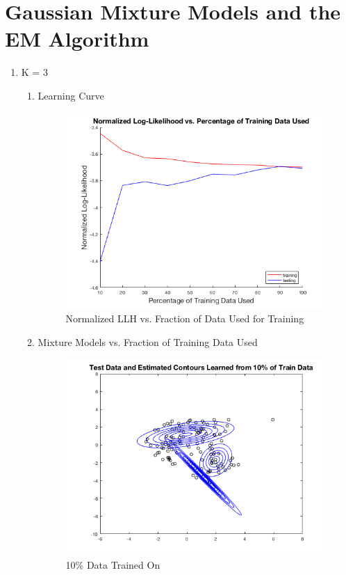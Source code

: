 \documentclass[english]{article}
\begin{document}
\section{Gaussian Mixture Models and the EM Algorithm}
\begin{enumerate}
    \item K = 3
    \begin{enumerate}
    
        \item Learning Curve
        
        \begin{figure}[H]
    	\centering
    	\includegraphics[scale = 0.5]{3_1_a}
    	\caption{Normalized LLH vs. Fraction of Data Used for Training}
    	\label{fig:3_1_a}
    	\end{figure}
	
        \item Mixture Models vs. Fraction of Training Data Used
        
        \begin{figure}[H]
        \centering
    	\includegraphics[scale = 0.5]{3_1_b_10}
    	\caption{10\% Data Trained On}
    	\label{fig:3_1_b_10}
    	\end{figure}
	

\end{enumerate}
\end{enumerate}
\end{document}
